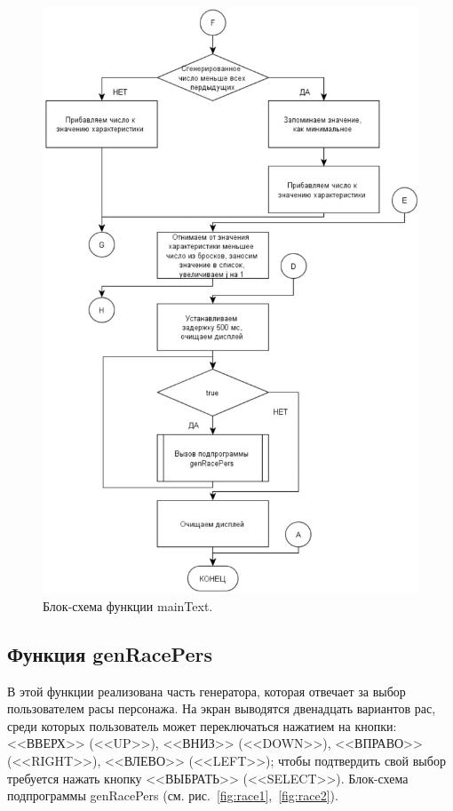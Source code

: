 \begin{figure}[H]
    \centering
    \includegraphics[scale=1]{mainText2.png}
    \caption{Блок-схема функции mainText.}
    \label{fig:main2}
\end{figure}

\subsection*{Функция genRacePers}

В этой функции реализована часть генератора, которая отвечает за выбор пользователем расы персонажа. На экран выводятся двенадцать вариантов рас, среди которых пользователь может переключаться нажатием на кнопки: <<ВВЕРХ>> (<<UP>>), <<ВНИЗ>> (<<DOWN>>), <<ВПРАВО>> (<<RIGHT>>), <<ВЛЕВО>> (<<LEFT>>); чтобы подтвердить свой выбор требуется нажать кнопку <<ВЫБРАТЬ>> (<<SELECT>>). Блок-схема подпрограммы genRacePers (см. рис.~\ref{fig:race1},~\ref{fig:race2}).

